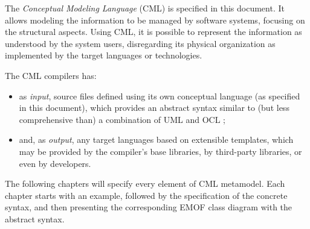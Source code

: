 The \emph{Conceptual Modeling Language} (CML) is specified in this document.
It allows modeling the information to be managed by software systems,
focusing on the structural aspects.
Using CML,
it is possible to represent the information as understood by the system users,
disregarding its physical organization as implemented by the target languages or technologies.

The CML compilers has:
\begin{itemize}
\item as \emph{input},
source files defined using its own conceptual language (as specified in this document),
which provides an abstract syntax similar to (but less comprehensive than) a combination of UML \cite{uml} and OCL \cite{ocl}; 
\item and, as \emph{output},
any target languages based on extensible templates,
which may be provided by the compiler's base libraries, by third-party libraries, or even by developers.
\end{itemize}

The following chapters will specify every element of CML metamodel.
Each chapter starts with an example,
followed by the specification of the concrete syntax,
and then presenting the corresponding EMOF \cite{emof} class diagram with the abstract syntax.

